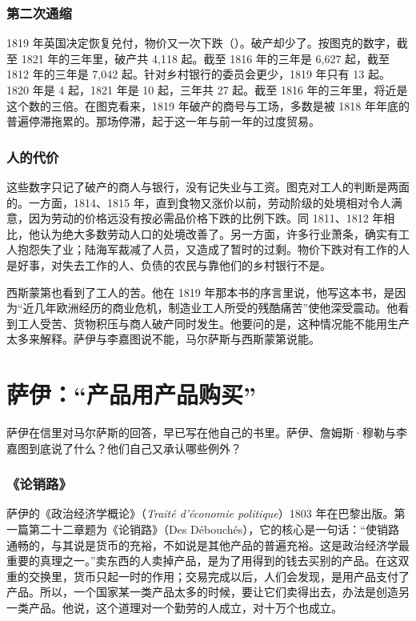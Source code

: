 \subsubsection{第二次通缩}
1819 年英国决定恢复兑付，物价又一次下跌（）。破产却少了。按图克的数字，截至 1821 年的三年里，破产共 4,118 起。截至 1816 年的三年是 6,627 起，截至 1812 年的三年是 7,042 起\cite{tooke1838v2}。针对乡村银行的委员会更少，1819 年只有 13 起。1820 年是 4 起，1821 年是 10 起，三年共 27 起。截至 1816 年的三年里，将近是这个数的三倍\cite{tooke1838v2}。在图克看来，1819 年破产的商号与工场，多数是被 1818 年年底的普遍停滞拖累的。那场停滞，起于这一年与前一年的过度贸易\cite{tooke1838v2}。

\subsubsection{人的代价}
这些数字只记了破产的商人与银行，没有记失业与工资。图克对工人的判断是两面的。一方面，1814、1815 年，直到食物又涨价以前，劳动阶级的处境相对令人满意，因为劳动的价格远没有按必需品价格下跌的比例下跌。同 1811、1812 年相比，他认为绝大多数劳动人口的处境改善了\cite{tooke1838v2}。另一方面，许多行业萧条，确实有工人抱怨失了业；陆海军裁减了人员，又造成了暂时的过剩\cite{tooke1838v2}。物价下跌对有工作的人是好事，对失去工作的人、负债的农民与靠他们的乡村银行不是。

西斯蒙第也看到了工人的苦。他在 1819 年那本书的序言里说，他写这本书，是因为“近几年欧洲经历的商业危机，制造业工人所受的残酷痛苦”使他深受震动\cite{sismondi1819}。他看到工人受苦、货物积压与商人破产同时发生。他要问的是，这种情况能不能用生产太多来解释。萨伊与李嘉图说不能，马尔萨斯与西斯蒙第说能。

\section{萨伊：“产品用产品购买”}\label{sec:say-law}

萨伊在信里对马尔萨斯的回答，早已写在他自己的书里。萨伊、詹姆斯·穆勒与李嘉图到底说了什么？他们自己又承认哪些例外？

\subsubsection{《论销路》}
萨伊的《政治经济学概论》（\emph{Traité d'économie politique}）1803 年在巴黎出版。第一篇第二十二章题为《论销路》（Des Débouchés）\cite{say1803}，它的核心是一句话：“使销路通畅的，与其说是货币的充裕，不如说是其他产品的普遍充裕。这是政治经济学最重要的真理之一。”\cite{say1803}卖东西的人卖掉产品，是为了用得到的钱去买别的产品。在这双重的交换里，货币只起一时的作用；交易完成以后，人们会发现，是用产品支付了产品\cite{say1803}。所以，一个国家某一类产品太多的时候，要让它们卖得出去，办法是创造另一类产品\cite{say1803}。他说，这个道理对一个勤劳的人成立，对十万个也成立\cite{say1803}。

